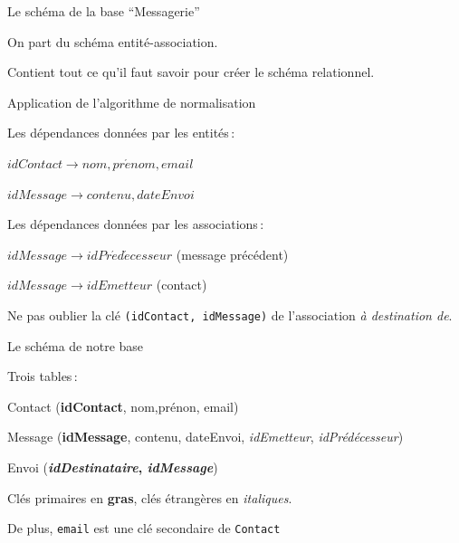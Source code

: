 

\begin{frame}{Le schéma de la base ``Messagerie''}

On part du schéma entité-association.

\vfill

\vfill


Contient tout ce qu'il faut savoir pour créer le schéma relationnel.

\end{frame}


\begin{frame}{Application de l'algorithme de normalisation}


Les dépendances données par les entités\,:
\vfill

\begin{redbullet}
  \item $idContact \to nom, pr\acute{e}nom, email$
    \item $idMessage \to contenu, dateEnvoi$
\end{redbullet}

Les dépendances données par les associations\,:
\vfill

\begin{redbullet}
        \item $idMessage \to idPr\acute{e}d\acute{e}cesseur$ (message précédent)
        \item $idMessage \to idEmetteur$ (contact)
\end{redbullet}

\vfill

Ne pas oublier la clé \texttt{(idContact, idMessage)}
de l'association \textit{à destination  de}.


\end{frame}


\begin{frame}{Le schéma de notre base}

Trois tables\,:
\vfill

\begin{redbullet}
  \item Contact (\textbf{idContact},  nom,prénon, email)
    \item Message (\textbf{idMessage},  contenu, dateEnvoi, \textit{idEmetteur},
        \textit{idPrédécesseur})
    \item Envoi (\textbf{\textit{idDestinataire}, \textit{idMessage}})
\end{redbullet}
\vfill

Clés primaires en \textbf{gras}, clés étrangères en \textit{italiques}.

\vspace*{0.5cm}

De plus, \texttt{email} est une \alert{clé secondaire} de \texttt{Contact}


\end{frame}


